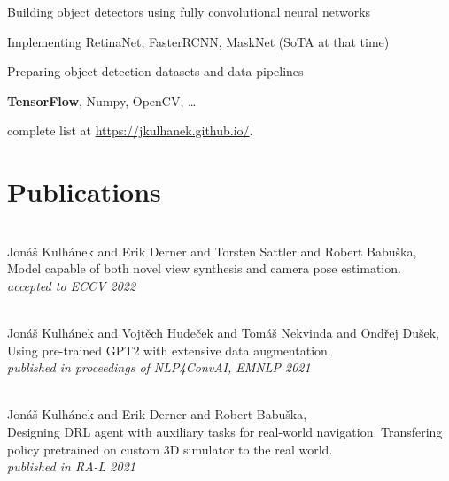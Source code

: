 \documentclass[a4paper]{deedy-resume}
\begin{document}
\begin{minipage}[t]{0.66\textwidth}

\begin{tightitemize}
\item Building object detectors using fully convolutional neural networks
\item Implementing RetinaNet, FasterRCNN, MaskNet (SoTA at that time)
\item Preparing object detection datasets and data pipelines
\item \textbf{TensorFlow}, Numpy, OpenCV, \ldots
\end{tightitemize}
\sectionspace

complete list at \url{https://jkulhanek.github.io/}.

\section{Publications}
\\
Jonáš Kulhánek and Erik Derner and Torsten Sattler and Robert Babuška,\\
Model capable of both novel view synthesis and camera pose estimation.\\

\textit{accepted to ECCV 2022}
\sectionspace

\\
Jonáš Kulhánek and Vojtěch Hudeček and Tomáš Nekvinda and Ondřej Dušek,\\
Using pre-trained GPT2 with extensive data augmentation.\\

\textit{published in proceedings of NLP4ConvAI, EMNLP 2021}
\sectionspace

\\
Jonáš Kulhánek and Erik Derner and Robert Babuška,\\
Designing DRL agent with auxiliary tasks for real-world navigation. Transfering policy pretrained on custom 3D simulator to the real world.\\

\textit{published in RA-L 2021}
\sectionspace



\vspace{-1cm}
\end{minipage}
\end{document}
